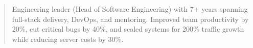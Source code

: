 \begin{quote}
Engineering leader (Head of Software Engineering) with 7+ years spanning full-stack delivery, DevOps, and mentoring. Improved team productivity by 20\%, cut critical bugs by 40\%, and scaled systems for 200\% traffic growth while reducing server costs by 30\%.
\end{quote}
\divider
{}

\par{}
 \\
 \\
   
\divider\smallskip
{}  \\
   
\par

